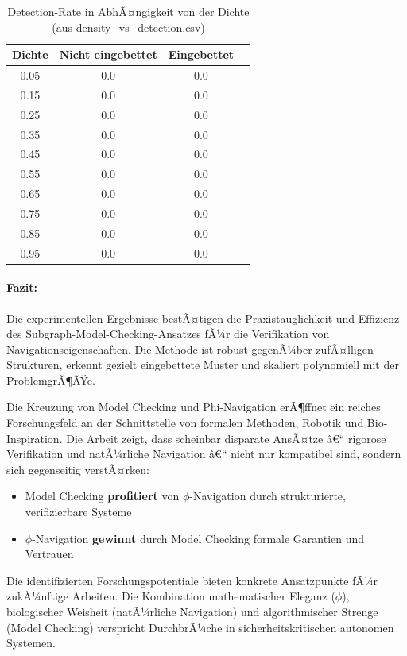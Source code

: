 ﻿\documentclass[a4paper,12pt]{article}
\theoremstyle{definition}
\begin{document}
\begin{table}[h!]
	\centering
	\caption{Detection-Rate in AbhÃ¤ngigkeit von der Dichte (aus density\_vs\_detection.csv)}
	\begin{tabular}{cccc}
		\toprule
		Dichte & Nicht eingebettet & Eingebettet \\
		\midrule
		0.05 & 0.0 & 0.0 \\
		0.15 & 0.0 & 0.0 \\
		0.25 & 0.0 & 0.0 \\
		0.35 & 0.0 & 0.0 \\
		0.45 & 0.0 & 0.0 \\
		0.55 & 0.0 & 0.0 \\
		0.65 & 0.0 & 0.0 \\
		0.75 & 0.0 & 0.0 \\
		0.85 & 0.0 & 0.0 \\
		0.95 & 0.0 & 0.0 \\
		\bottomrule
	\end{tabular}
\end{table}

\paragraph{Fazit:} Die experimentellen Ergebnisse bestÃ¤tigen die Praxistauglichkeit und Effizienz des Subgraph-Model-Checking-Ansatzes fÃ¼r die Verifikation von Navigationseigenschaften. Die Methode ist robust gegenÃ¼ber zufÃ¤lligen Strukturen, erkennt gezielt eingebettete Muster und skaliert polynomiell mit der ProblemgrÃ¶ÃŸe.

Die Kreuzung von Model Checking und Phi-Navigation erÃ¶ffnet ein reiches Forschungsfeld an der Schnittstelle von formalen Methoden, Robotik und Bio-Inspiration. Die Arbeit zeigt, dass scheinbar disparate AnsÃ¤tze â€“ rigorose Verifikation und natÃ¼rliche Navigation â€“ nicht nur kompatibel sind, sondern sich gegenseitig verstÃ¤rken:

\begin{itemize}
	\item Model Checking \textbf{profitiert} von $\phi$-Navigation durch strukturierte, verifizierbare Systeme
	\item $\phi$-Navigation \textbf{gewinnt} durch Model Checking formale Garantien und Vertrauen
\end{itemize}

Die identifizierten Forschungspotentiale bieten konkrete Ansatzpunkte fÃ¼r zukÃ¼nftige Arbeiten. Die Kombination mathematischer Eleganz ($\phi$), biologischer Weisheit (natÃ¼rliche Navigation) und algorithmischer Strenge (Model Checking) verspricht DurchbrÃ¼che in sicherheitskritischen autonomen Systemen.
\end{document}
